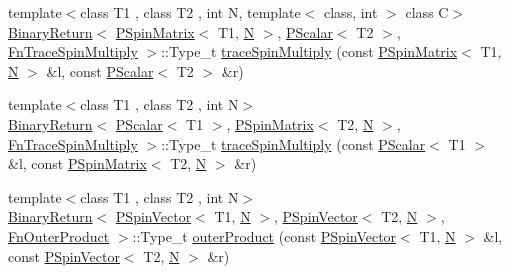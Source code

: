 \begin{DoxyCompactItemize}
\item 
{\footnotesize template$<$class T1 , class T2 , int N, template$<$ class, int $>$ class C$>$ }\\\mbox{\hyperlink{structENSEM_1_1BinaryReturn}{Binary\+Return}}$<$ \mbox{\hyperlink{classENSEM_1_1PSpinMatrix}{P\+Spin\+Matrix}}$<$ T1, \mbox{\hyperlink{operator__name__util_8cc_a7722c8ecbb62d99aee7ce68b1752f337}{N}} $>$, \mbox{\hyperlink{classENSEM_1_1PScalar}{P\+Scalar}}$<$ T2 $>$, \mbox{\hyperlink{structENSEM_1_1FnTraceSpinMultiply}{Fn\+Trace\+Spin\+Multiply}} $>$\+::Type\+\_\+t \mbox{\hyperlink{group__primspinmatrix_ga397616dd6ad517f1cf893903cd93c2c8}{trace\+Spin\+Multiply}} (const \mbox{\hyperlink{classENSEM_1_1PSpinMatrix}{P\+Spin\+Matrix}}$<$ T1, \mbox{\hyperlink{operator__name__util_8cc_a7722c8ecbb62d99aee7ce68b1752f337}{N}} $>$ \&l, const \mbox{\hyperlink{classENSEM_1_1PScalar}{P\+Scalar}}$<$ T2 $>$ \&r)
\item 
{\footnotesize template$<$class T1 , class T2 , int N$>$ }\\\mbox{\hyperlink{structENSEM_1_1BinaryReturn}{Binary\+Return}}$<$ \mbox{\hyperlink{classENSEM_1_1PScalar}{P\+Scalar}}$<$ T1 $>$, \mbox{\hyperlink{classENSEM_1_1PSpinMatrix}{P\+Spin\+Matrix}}$<$ T2, \mbox{\hyperlink{operator__name__util_8cc_a7722c8ecbb62d99aee7ce68b1752f337}{N}} $>$, \mbox{\hyperlink{structENSEM_1_1FnTraceSpinMultiply}{Fn\+Trace\+Spin\+Multiply}} $>$\+::Type\+\_\+t \mbox{\hyperlink{group__primspinmatrix_ga2dc2ab87ff63abab3c74a0a1f1dd3d09}{trace\+Spin\+Multiply}} (const \mbox{\hyperlink{classENSEM_1_1PScalar}{P\+Scalar}}$<$ T1 $>$ \&l, const \mbox{\hyperlink{classENSEM_1_1PSpinMatrix}{P\+Spin\+Matrix}}$<$ T2, \mbox{\hyperlink{operator__name__util_8cc_a7722c8ecbb62d99aee7ce68b1752f337}{N}} $>$ \&r)
\item 
{\footnotesize template$<$class T1 , class T2 , int N$>$ }\\\mbox{\hyperlink{structENSEM_1_1BinaryReturn}{Binary\+Return}}$<$ \mbox{\hyperlink{classENSEM_1_1PSpinVector}{P\+Spin\+Vector}}$<$ T1, \mbox{\hyperlink{operator__name__util_8cc_a7722c8ecbb62d99aee7ce68b1752f337}{N}} $>$, \mbox{\hyperlink{classENSEM_1_1PSpinVector}{P\+Spin\+Vector}}$<$ T2, \mbox{\hyperlink{operator__name__util_8cc_a7722c8ecbb62d99aee7ce68b1752f337}{N}} $>$, \mbox{\hyperlink{structENSEM_1_1FnOuterProduct}{Fn\+Outer\+Product}} $>$\+::Type\+\_\+t \mbox{\hyperlink{group__primspinmatrix_ga6ff39d20fc8369664c9b3849e00d654d}{outer\+Product}} (const \mbox{\hyperlink{classENSEM_1_1PSpinVector}{P\+Spin\+Vector}}$<$ T1, \mbox{\hyperlink{operator__name__util_8cc_a7722c8ecbb62d99aee7ce68b1752f337}{N}} $>$ \&l, const \mbox{\hyperlink{classENSEM_1_1PSpinVector}{P\+Spin\+Vector}}$<$ T2, \mbox{\hyperlink{operator__name__util_8cc_a7722c8ecbb62d99aee7ce68b1752f337}{N}} $>$ \&r)

\end{DoxyCompactItemize}
